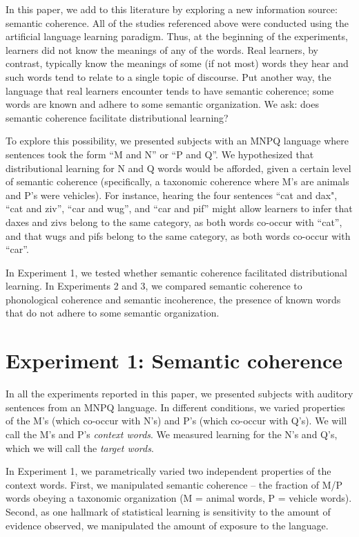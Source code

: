 \documentclass[man,floatsintext]{apa6}
\begin{document}
In this paper, we add to this literature by exploring a new
information source: semantic coherence. All of the studies referenced
above were conducted using the artificial language learning
paradigm. Thus, at the beginning of the experiments, learners did not
know the meanings of any of the words. Real learners, by contrast,
typically know the meanings of some (if not most) words they hear and
such words tend to relate to a single topic of discourse. Put another
way, the language that real learners encounter tends to have semantic
coherence; some words are known and adhere to some semantic
organization. We ask: does semantic coherence facilitate
distributional learning?

To explore this possibility, we presented subjects with an MNPQ
language where sentences took the form ``M and N'' or ``P and Q''. We
hypothesized that distributional learning for N and Q words would be
afforded, given a certain level of semantic coherence (specifically, a
taxonomic coherence where M's are animals and P's were vehicles). For
instance, hearing the four sentences ``cat and dax", ``cat and ziv'',
``car and wug'', and ``car and pif'' might allow learners to infer
that daxes and zivs belong to the same category, as both words
co-occur with ``cat'', and that wugs and pifs belong to the same
category, as both words co-occur with ``car''.

In Experiment 1, we tested whether semantic coherence facilitated
distributional learning. In Experiments 2 and 3, we compared semantic
coherence to phonological coherence and semantic incoherence, the
presence of known words that do not adhere to some semantic
organization.

\section{Experiment 1: Semantic coherence}

In all the experiments reported in this paper, we presented subjects
with auditory sentences from an MNPQ language. In different
conditions, we varied properties of the M's (which co-occur with N's)
and P's (which co-occur with Q's). We will call the M's and P's
\emph{context words}. We measured learning for the N's and Q's, which
we will call the \emph{target words}.

In Experiment 1, we parametrically varied two independent properties
of the context words. First, we manipulated semantic coherence -- the
fraction of M/P words obeying a taxonomic organization (M = animal
words, P = vehicle words). Second, as one hallmark of statistical
learning is sensitivity to the amount of evidence observed, we
manipulated the amount of exposure to the language.
\end{document}
